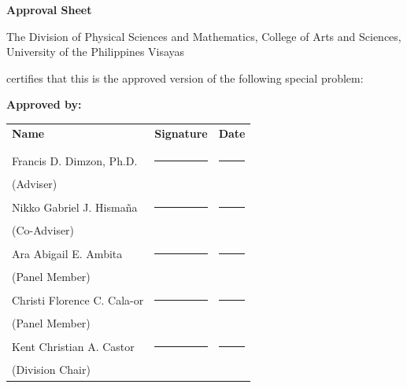 \begin{center}
\textbf{Approval Sheet}

The Division of Physical Sciences and Mathematics, College of Arts and Sciences, University of the Philippines Visayas 

certifies that this is the approved version of the following special problem:

\end{center}

{\small\textbf{Approved by:}}

\newcommand{\signaturerule}{\rule{10em}{.4pt}}
	\begin{tabular}{lll}
		\bfseries Name  & \bfseries Signature & \bfseries Date\\ \\
		Francis D. Dimzon, Ph.D. &\signaturerule  & \signaturerule\\ 
		\multicolumn{1}{l}{(Adviser)} \\ 
		Nikko Gabriel J. Hismaña &\signaturerule  & \signaturerule\\ 
		\multicolumn{1}{l}{(Co-Adviser)} \\ 
		Ara Abigail E. Ambita &\signaturerule &\signaturerule\\
		\multicolumn{1}{l}{(Panel Member)}  \\
		Christi Florence C. Cala-or &\signaturerule &\signaturerule\\
		\multicolumn{1}{l}{(Panel Member)}\\
		Kent Christian A. Castor &\signaturerule &\signaturerule\\
		\multicolumn{1}{l}{(Division Chair)}

	\end{tabular}
